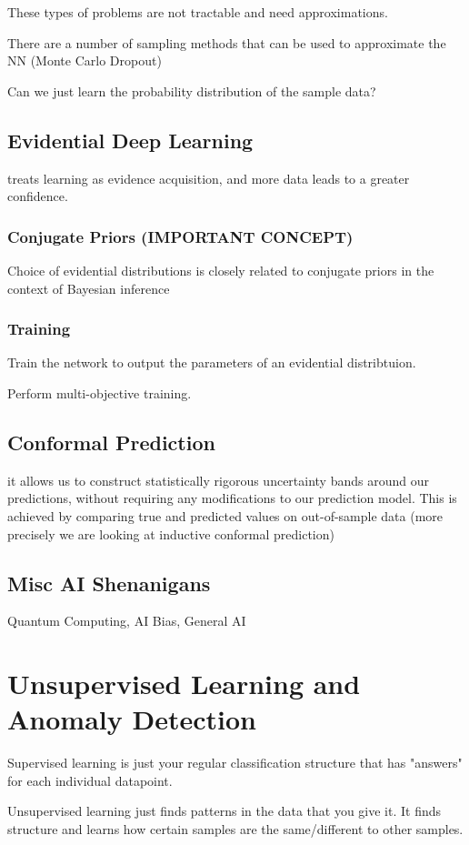 \documentclass[fleqn]{report}
\begin{document}
These types of problems are not tractable and need approximations. 

There are a number of sampling methods that can be used to approximate 
the NN (Monte Carlo Dropout)

Can we just learn the probability distribution of the sample data?

\section{Evidential Deep Learning}
treats learning as evidence acquisition, and more data leads 
to a greater confidence. 

\subsection{Conjugate Priors (IMPORTANT CONCEPT)}
Choice of evidential distributions is closely related to 
conjugate priors in the context of Bayesian inference

\subsection{Training}
Train the network to output the parameters of an 
evidential distribtuion. 

Perform multi-objective training. 

\section{Conformal Prediction}
it allows us to construct statistically rigorous uncertainty bands around 
our predictions, without requiring any modifications to our prediction model. 
This is achieved by comparing true and predicted values on out-of-sample data 
(more precisely we are looking at inductive conformal prediction)

\section{Misc AI Shenanigans}
Quantum Computing, AI Bias, General AI 

\chapter{Unsupervised Learning and Anomaly Detection}
Supervised learning is just your regular classification structure 
that has "answers" for each individual datapoint. 

Unsupervised learning just finds patterns in the data that you give it. It 
finds structure and learns how certain samples are the same/different to 
other samples. 
\end{document}
